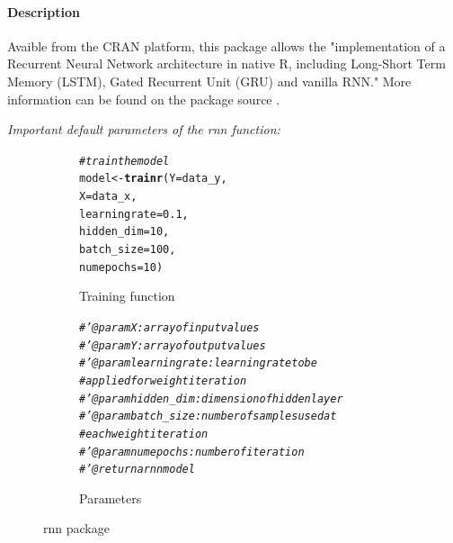 \documentclass[letter,8pt]{article}\usepackage[]{graphicx}\usepackage[]{color}
\makeatletter
\newcommand{\hlnum}[1]{\textcolor[rgb]{0.686,0.059,0.569}{#1}}%
\newcommand{\hlcom}[1]{\textcolor[rgb]{0.678,0.584,0.686}{\textit{#1}}}%
\newcommand{\hlstd}[1]{\textcolor[rgb]{0.345,0.345,0.345}{#1}}%
\newcommand{\hlkwb}[1]{\textcolor[rgb]{0.69,0.353,0.396}{#1}}%
\newcommand{\hlkwc}[1]{\textcolor[rgb]{0.333,0.667,0.333}{#1}}%
\newcommand{\hlkwd}[1]{\textcolor[rgb]{0.737,0.353,0.396}{\textbf{#1}}}%
\newenvironment{kframe}{%
 \def\at@end@of@kframe{}%
 \ifinner\ifhmode%
  \def\at@end@of@kframe{\end{minipage}}%
  \begin{minipage}{\columnwidth}%
 \fi\fi%
 \def\FrameCommand##1{\hskip\@totalleftmargin \hskip-\fboxsep
 \colorbox{shadecolor}{##1}\hskip-\fboxsep
     \hskip-\linewidth \hskip-\@totalleftmargin \hskip\columnwidth}%
 \MakeFramed {\advance\hsize-\width
   \@totalleftmargin\z@ \linewidth\hsize
   \@setminipage}}%
 {\par\unskip\endMakeFramed%
 \at@end@of@kframe}
\newenvironment{knitrout}{}{} %
\makeatother
\begin{document}
\paragraph{Description}
Avaible from the CRAN platform, this package allows the "implementation of a Recurrent Neural Network architecture in native R, including Long-Short Term Memory (LSTM), Gated Recurrent Unit (GRU) and vanilla RNN." More information can be found on the package source \cite{rnn2019}.

\textit{Important default parameters of the rnn function:}

\begin{figure}[H]
  \begin{subfigure}{0.5\textwidth}
\begin{knitrout}
\color{fgcolor}\begin{kframe}
\begin{alltt}
\hlcom{# train the model}
\hlstd{model} \hlkwb{<-} \hlkwd{trainr}\hlstd{(}\hlkwc{Y}\hlstd{=data_y,}
                \hlkwc{X}\hlstd{=data_x,}
                \hlkwc{learningrate} \hlstd{=} \hlnum{0.1}\hlstd{,}
                \hlkwc{hidden_dim} \hlstd{=} \hlnum{10}\hlstd{,}
                \hlkwc{batch_size} \hlstd{=} \hlnum{100}\hlstd{,}
                \hlkwc{numepochs} \hlstd{=} \hlnum{10}\hlstd{)}
\end{alltt}
\end{kframe}
\end{knitrout}
    \caption{Training function}
  \end{subfigure}
  \begin{subfigure}{0.5\textwidth}
    \centering
\begin{knitrout}
\color{fgcolor}\begin{kframe}
\begin{alltt}
\hlcom{#' @param X : array of input values}
\hlcom{#' @param Y : array of output values}
\hlcom{#' @param learningrate : learning rate to be }
\hlcom{#         applied for weight iteration}
\hlcom{#' @param hidden_dim : dimension of hidden layer }
\hlcom{#' @param batch_size : number of samples used at}
\hlcom{#         each weight iteration}
\hlcom{#' @param numepochs : number of iteration}
\hlcom{#' @return a rnn model}
\end{alltt}
\end{kframe}
\end{knitrout}
    \caption{Parameters}
  \end{subfigure}
    \caption{rnn package}
\end{figure}
\end{document}
